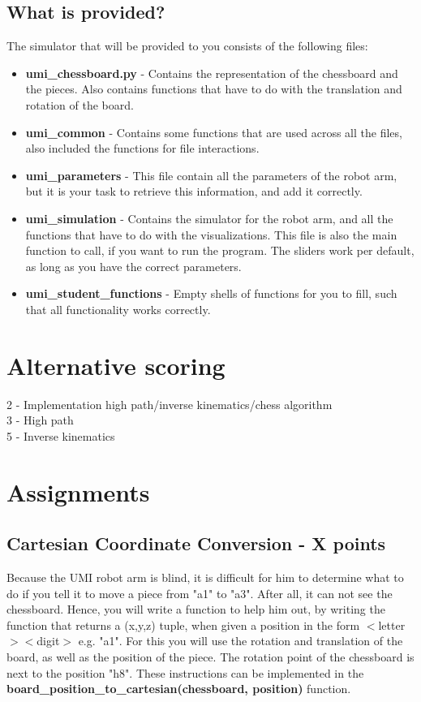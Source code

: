 \documentclass{article}
\begin{document}
\subsection*{What is provided?}
The simulator that will be provided to you consists of the following files:
\begin{itemize}
    \item \textbf{umi\_chessboard.py} - Contains the representation of the chessboard and the pieces. Also contains functions that have to do with the translation and rotation of the board.
    \item \textbf{umi\_common} - Contains some functions that are used across all the files, also included the functions for file interactions.
    \item \textbf{umi\_parameters} - This file contain all the parameters of the robot arm, but it is your task to retrieve this information, and add it correctly.
    \item \textbf{umi\_simulation} - Contains the simulator for the robot arm, and all the functions that have to do with the visualizations. This file is also the main function to call, if you want to run the program. The sliders work per default, as long as you have the correct parameters.
    \item \textbf{umi\_student\_functions} - Empty shells of functions for you to fill, such that all functionality works correctly.
\end{itemize}

\section*{Alternative scoring}
2 - Implementation high path/inverse kinematics/chess algorithm\\
3 - High path\\
5 - Inverse kinematics
\section{Assignments}

\subsection*{Cartesian Coordinate Conversion - X points}
Because the UMI robot arm is blind, it is difficult for him to determine what to do if you tell it to move a piece from "a1" to "a3". After all, it can not see the chessboard. Hence, you will write a function to help him out, by writing the function that returns a (x,y,z) tuple, when given a position in the form $<$letter$><$digit$>$ e.g. "a1". For this you will use the rotation and translation of the board, as well as the position of the piece. The rotation point of the chessboard is next to the position "h8". These instructions can be implemented in the \textbf{board\_position\_to\_cartesian(chessboard, position)} function.
\end{document}
